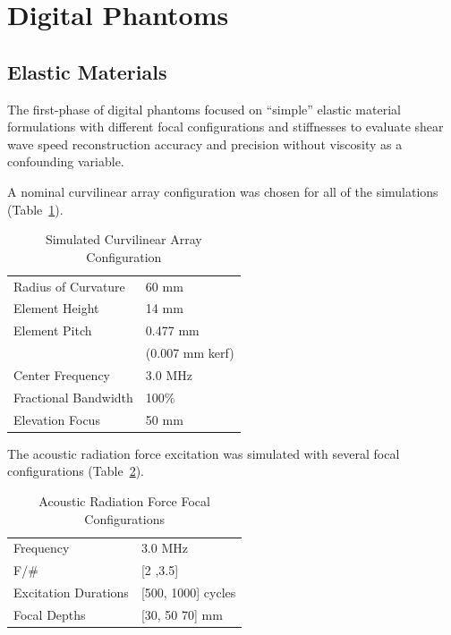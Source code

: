 \section{Digital Phantoms}\label{sect:digital_phantoms}

\subsection{Elastic Materials}
The first-phase of digital phantoms focused on ``simple'' elastic material
formulations with different focal configurations and stiffnesses to evaluate
shear wave speed reconstruction accuracy and precision without viscosity as a
confounding variable.

A nominal curvilinear array configuration was chosen for all of the simulations
(Table~\ref{table:curvilinear}).

\begin{table}[htb!]
    \centering
    \caption{Simulated Curvilinear Array Configuration}
    \begin{tabular}{|l|l|}
    \hline
    Radius of Curvature & 60 mm \\
    Element Height & 14 mm \\
    Element Pitch & 0.477 mm \\
     & (0.007 mm kerf) \\
    Center Frequency & 3.0 MHz \\
    Fractional Bandwidth & 100\% \\
    Elevation Focus & 50 mm \\
    \hline
    \end{tabular}
\label{table:curvilinear}
\end{table}

The acoustic radiation force excitation was simulated with several focal
configurations (Table~\ref{table:arf}).

\begin{table}[htb!]
    \centering
    \caption{Acoustic Radiation Force Focal Configurations}
    \begin{tabular}{|l|l|}
    \hline
    Frequency & 3.0 MHz \\
    F/\# & [2 ,3.5] \\
    Excitation Durations & [500, 1000] cycles \\
    Focal Depths & [30, 50 70] mm \\
    \hline
    \end{tabular}
\label{table:arf}
\end{table}

